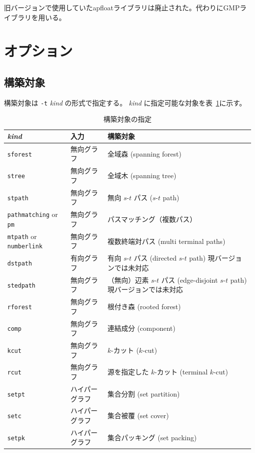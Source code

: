 \documentclass{jsarticle}
\begin{document}
旧バージョンで使用していたapfloatライブラリは廃止された。代わりにGMPライブラリを用いる。

\section{オプション}\label{sec:option}

\subsection{構築対象}

構築対象は \texttt{-t} \textit{kind} の形式で指定する。
\textit{kind} に指定可能な対象を表~\ref{tab:kind}に示す。

\begin{table}
\caption{構築対象の指定}
\label{tab:kind}
\begin{center}
\begin{tabular}[t]{|l|l|l|}
\hline
\textit{kind} & 入力 & 構築対象 \\ \hline \hline
\texttt{sforest} & 無向グラフ &全域森 (spanning forest) \\ \hline
\texttt{stree} & 無向グラフ & 全域木 (spanning tree) \\ \hline
\texttt{stpath} & 無向グラフ & 無向 $s$-$t$ パス ($s$-$t$ path) \\ \hline
\texttt{pathmatching} or \texttt{pm} & 無向グラフ & パスマッチング（複数パス） \\ \hline
\texttt{mtpath} or \texttt{numberlink} & 無向グラフ & 複数終端対パス (multi terminal paths) \\ \hline
\texttt{dstpath} & 有向グラフ & 有向 $s$-$t$ パス (directed $s$-$t$ path) 現バージョンでは未対応 \\ \hline
\texttt{stedpath} & 無向グラフ & （無向）辺素 $s$-$t$ パス (edge-disjoint $s$-$t$ path) 現バージョンでは未対応 \\ \hline
\texttt{rforest} & 無向グラフ & 根付き森 (rooted forest) \\ \hline
\texttt{comp} & 無向グラフ & 連結成分 (component) \\ \hline
\texttt{kcut} & 無向グラフ & $k$-カット ($k$-cut) \\ \hline
\texttt{rcut} & 無向グラフ & 源を指定した $k$-カット (terminal $k$-cut) \\ \hline
\texttt{setpt} & ハイパーグラフ & 集合分割 (set partition) \\ \hline
\texttt{setc} & ハイパーグラフ & 集合被覆 (set cover) \\ \hline
\texttt{setpk} & ハイパーグラフ & 集合パッキング (set packing) \\
\hline
\end{tabular}
\end{center}
\end{table}
\end{document}
